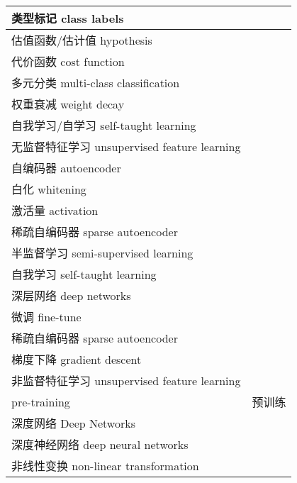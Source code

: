 \begin{longtable}[h]{m{}m{}}
类型标记 class labels \\
  \midrule

估值函数/估计值 hypothesis \\
  \midrule

代价函数 cost function \\
  \midrule

多元分类 multi-class classification \\
  \midrule

权重衰减 weight decay \\
  \midrule

自我学习/自学习 self-taught learning \\
  \midrule

无监督特征学习 unsupervised feature learning \\
  \midrule

自编码器 autoencoder \\
  \midrule

白化 whitening \\
  \midrule

激活量 activation \\
  \midrule

稀疏自编码器 sparse autoencoder \\
  \midrule

半监督学习 semi-supervised learning \\
  \midrule

自我学习 self-taught learning \\
  \midrule

深层网络 deep networks \\
  \midrule

微调 fine-tune \\
  \midrule

稀疏自编码器 sparse autoencoder \\
  \midrule

梯度下降 gradient descent \\
  \midrule

非监督特征学习 unsupervised feature learning \\
  \midrule

    pre-training & 预训练 \\
  \midrule

深度网络 Deep Networks \\
  \midrule

深度神经网络 deep neural networks \\
  \midrule

非线性变换 non-linear transformation \\
  \midrule


\end{longtable}
